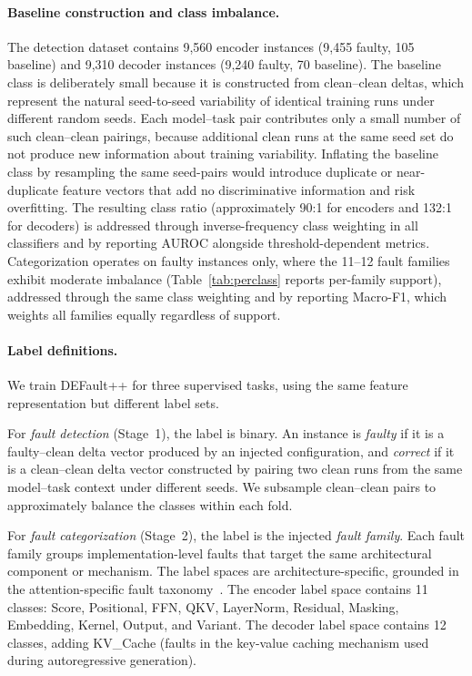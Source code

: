 \paragraph{Baseline construction and class imbalance.}
The detection dataset contains 9{,}560 encoder instances (9{,}455 faulty, 105 baseline) and 9{,}310 decoder instances (9{,}240 faulty, 70 baseline). The baseline class is deliberately small because it is constructed from clean--clean deltas, which represent the natural seed-to-seed variability of identical training runs under different random seeds. Each model--task pair contributes only a small number of such clean--clean pairings, because additional clean runs at the same seed set do not produce new information about training variability. Inflating the baseline class by resampling the same seed-pairs would introduce duplicate or near-duplicate feature vectors that add no discriminative information and risk overfitting. The resulting class ratio (approximately 90:1 for encoders and 132:1 for decoders) is addressed through inverse-frequency class weighting in all classifiers and by reporting AUROC alongside threshold-dependent metrics. Categorization operates on faulty instances only, where the 11--12 fault families exhibit moderate imbalance (Table~\ref{tab:perclass} reports per-family support), addressed through the same class weighting and by reporting Macro-F1, which weights all families equally regardless of support.

\paragraph{Label definitions.}
We train DEFault++ for three supervised tasks, using the same feature representation but different label sets.

For \emph{fault detection} (Stage~1), the label is binary. An instance is \textit{faulty} if it is a faulty--clean delta vector produced by an injected configuration, and \textit{correct} if it is a clean--clean delta vector constructed by pairing two clean runs from the same model--task context under different seeds. We subsample clean--clean pairs to approximately balance the classes within each fold.

For \emph{fault categorization} (Stage~2), the label is the injected \emph{fault family}. Each fault family groups implementation-level faults that target the same architectural component or mechanism. The label spaces are architecture-specific, grounded in the attention-specific fault taxonomy~\cite{attention_taxonomy}. The encoder label space contains 11 classes: Score, Positional, FFN, QKV, LayerNorm, Residual, Masking, Embedding, Kernel, Output, and Variant. The decoder label space contains 12 classes, adding KV\_Cache (faults in the key-value caching mechanism used during autoregressive generation).

